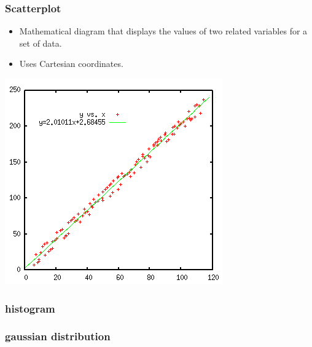\documentclass{beamer}
\begin{document}
\begin{frame}

\frametitle{Scatterplot}
\begin{itemize}
\item Mathematical diagram that displays the values of two related variables for a set of data.
\item Uses Cartesian coordinates.
\end{itemize}
\begin{center}
\includegraphics[scale=0.45]{scatterpot1}
\end{center}

\end{frame}

\begin{frame}
\frametitle{histogram}
\end{frame}

\begin{frame}
\frametitle{gaussian distribution}
\end{frame}
\end{document}
